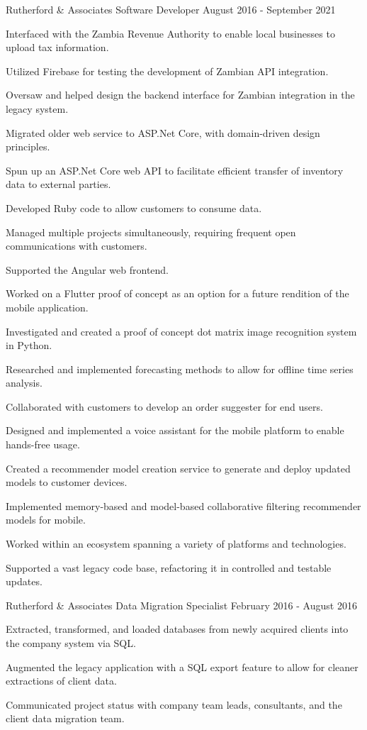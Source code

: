\documentclass{marvinkassabian_resume}
\begin{document}
\subsectionpositiondate
{Rutherford \& Associates}
{Software Developer}
{August 2016 - September 2021}
\resumesublistbegin
\item Interfaced with the Zambia Revenue Authority to enable local businesses to upload tax information.
\item Utilized Firebase for testing the development of Zambian API integration.
\item Oversaw and helped design the backend interface for Zambian integration in the legacy system.
\item Migrated older web service to ASP.Net Core, with domain-driven design principles.
\item Spun up an ASP.Net Core web API to facilitate efficient transfer of inventory data to external parties.
\item Developed Ruby code to allow customers to consume data.
\item Managed multiple projects simultaneously, requiring frequent open communications with customers.
\item Supported the Angular web frontend.
\item Worked on a Flutter proof of concept as an option for a future rendition of the mobile application.
\item Investigated and created a proof of concept dot matrix image recognition system in Python.
\item Researched and implemented forecasting methods to allow for offline time series analysis.
\item Collaborated with customers to develop an order suggester for end users.
\item Designed and implemented a voice assistant for the mobile platform to enable hands-free usage.
\item Created a recommender model creation service to generate and deploy updated models to customer devices.
\item Implemented memory-based and model-based collaborative filtering recommender models for mobile.
\item Worked within an ecosystem spanning a variety of platforms and technologies.
\item Supported a vast legacy code base, refactoring it in controlled and testable updates.
\resumesublistend

\subsectionpositiondate
{Rutherford \& Associates}
{Data Migration Specialist}
{February 2016 - August 2016}
\resumesublistbegin
\item Extracted, transformed, and loaded databases from newly acquired clients into the company system via SQL.
\item Augmented the legacy \cpp application with a SQL export feature to allow for cleaner extractions of client data.
\item Communicated project status with company team leads, consultants, and the client data migration team.
\resumesublistend
\end{document}
